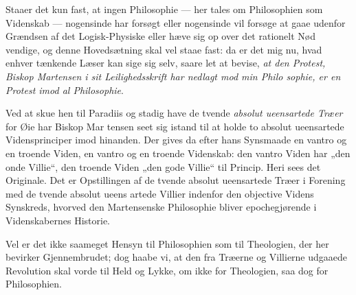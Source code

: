 \documentclass[12pt]{book}
\newcommand{\opage}[1]{\marginnote{\footnotesize\textit{[#1]}}}
\begin{document}
Staaer det kun fast, at ingen Philosophie --- her tales
om Philosophien som Videnskab --- nogensinde har forsøgt
eller nogensinde vil forsøge at gaae udenfor Grændsen af
det Logisk-Physiske eller hæve sig op over det rationelt Nød\-%
vendige, og denne Hovedsætning skal vel staae fast: da er
det mig nu, hvad enhver tænkende Læser kan sige sig selv,
saare let at bevise, \emph{at den Protest, Biskop Martensen
i sit Leilighedsskrift har nedlagt mod min Philo\-%
sophie, er en Protest imod al Philosophie}.

Ved at skue hen til Paradiis og stadig have de tvende
\emph{absolut ueensartede Træer} for Øie har Biskop Mar\-%
tensen seet sig istand til at holde to absolut ueensartede
Vidensprinciper imod hinanden. Der gives da efter hans
Synsmaade en vantro og en troende Viden, en vantro og
en troende Videnskab: den vantro Viden har „den onde Villie“,
den troende Viden „den gode Villie“ til Princip. Heri sees
\opage{109}\setcounter{footnote}{0}%
det Originale. Det er Opstillingen af de tvende absolut
ueensartede Træer i Forening med de tvende absolut ueens\-%
artede Villier indenfor den objective Videns Synskreds,
hvorved den Martensenske Philosophie bliver epochegjørende i
Videnskabernes Historie.

Vel er det ikke saameget Hensyn til Philosophien som
til Theologien, der her bevirker Gjennembrudet; dog haabe
vi, at den fra Træerne og Villierne udgaaede Revolution skal
vorde til Held og Lykke, om ikke for Theologien, saa dog
for Philosophien.
\end{document}

